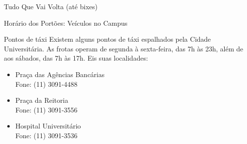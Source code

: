 \begin{secao}{Tudo Que Vai Volta (até bixes)}
\begin{subsecao}{Horário dos Portões: Veículos no Campus}
\end{subsecao}
\pagebreak
\begin{subsecao}{Pontos de táxi}
Existem alguns pontos de táxi espalhados pela Cidade Universitária. As frotas
operam de segunda à sexta-feira, das 7h às 23h, além de aos sábados, das 7h às
17h. Eis suas localidades:

\begin{itemize}
\item Praça das Agências Bancárias\\
Fone: (11) 3091-4488

\item Praça da Reitoria\\
Fone: (11) 3091-3556

\item Hospital Universitário\\
Fone: (11) 3091-3536
\end{itemize}
\end{subsecao}

\end{secao}
